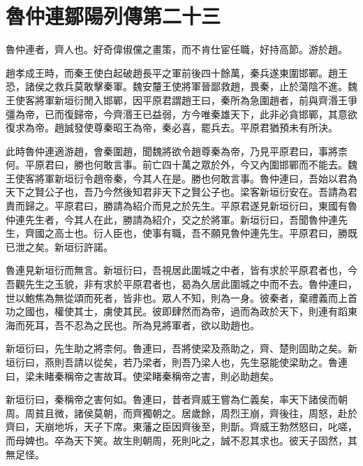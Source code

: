 \chapter{魯仲連鄒陽列傳第二十三}

魯仲連者，齊人也。好奇偉俶儻之畫策，而不肯仕宦任職，好持高節。游於趙。

趙孝成王時，而秦王使白起破趙長平之軍前後四十餘萬，秦兵遂東圍邯鄲。趙王恐，諸侯之救兵莫敢擊秦軍。魏安釐王使將軍晉鄙救趙，畏秦，止於蕩陰不進。魏王使客將軍新垣衍閒入邯鄲，因平原君謂趙王曰，秦所為急圍趙者，前與齊湣王爭彊為帝，已而復歸帝，今齊湣王已益弱，方今唯秦雄天下，此非必貪邯鄲，其意欲復求為帝。趙誠發使尊秦昭王為帝，秦必喜，罷兵去。平原君猶預未有所決。

此時魯仲連適游趙，會秦圍趙，聞魏將欲令趙尊秦為帝，乃見平原君曰，事將柰何。平原君曰，勝也何敢言事。前亡四十萬之眾於外，今又內圍邯鄲而不能去。魏王使客將軍新垣衍令趙帝秦，今其人在是。勝也何敢言事。魯仲連曰，吾始以君為天下之賢公子也，吾乃今然後知君非天下之賢公子也。梁客新垣衍安在。吾請為君責而歸之。平原君曰，勝請為紹介而見之於先生。平原君遂見新垣衍曰，東國有魯仲連先生者，今其人在此，勝請為紹介，交之於將軍。新垣衍曰，吾聞魯仲連先生，齊國之高士也。衍人臣也，使事有職，吾不願見魯仲連先生。平原君曰，勝既已泄之矣。新垣衍許諾。

魯連見新垣衍而無言。新垣衍曰，吾視居此圍城之中者，皆有求於平原君者也，今吾觀先生之玉貌，非有求於平原君者也，曷為久居此圍城之中而不去。魯仲連曰，世以鮑焦為無從頌而死者，皆非也。眾人不知，則為一身。彼秦者，棄禮義而上首功之國也，權使其士，虜使其民。彼即肆然而為帝，過而為政於天下，則連有蹈東海而死耳，吾不忍為之民也。所為見將軍者，欲以助趙也。

新垣衍曰，先生助之將柰何。魯連曰，吾將使梁及燕助之，齊、楚則固助之矣。新垣衍曰，燕則吾請以從矣，若乃梁者，則吾乃梁人也，先生惡能使梁助之。魯連曰，梁未睹秦稱帝之害故耳。使梁睹秦稱帝之害，則必助趙矣。

新垣衍曰，秦稱帝之害何如。魯連曰，昔者齊威王嘗為仁義矣，率天下諸侯而朝周。周貧且微，諸侯莫朝，而齊獨朝之。居歲餘，周烈王崩，齊後往，周怒，赴於齊曰，天崩地坼，天子下席。東藩之臣因齊後至，則斮。齊威王勃然怒曰，叱嗟，而母婢也。卒為天下笑。故生則朝周，死則叱之，誠不忍其求也。彼天子固然，其無足怪。

